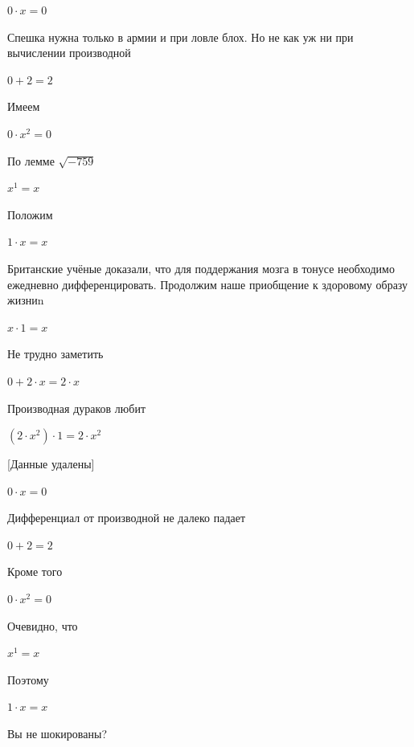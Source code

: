 \documentclass[12pt,a4paper,fleqn]{article}
\begin{document}
\begin{center}
$0 \cdot x = 0$\end{center}
Спешка нужна только в армии и при ловле блох. Но не как уж ни при вычислении производной\cite{link2}

\begin{center}
$0+2 = 2$\end{center}
Имеем

\begin{center}
$0 \cdot x^{2} = 0$\end{center}
По лемме $\sqrt{-759}$
\begin{center}
$x^{1} = x$\end{center}
Положим

\begin{center}
$1 \cdot x = x$\end{center}
Британские учёные доказали, что для поддержания мозга в тонусе необходимо ежедневно дифференцировать. Продолжим наше приобщение к здоровому образу жизниn

\begin{center}
$x \cdot 1 = x$\end{center}
Не трудно заметить

\begin{center}
$0+2 \cdot x = 2 \cdot x$\end{center}
Производная дураков любит\cite{link2}

\begin{center}
$(2 \cdot x^{2}) \cdot 1 = 2 \cdot x^{2}$\end{center}
[Данные удалены]

\begin{center}
$0 \cdot x = 0$\end{center}
Дифференциал от производной не далеко падает\cite{link2}

\begin{center}
$0+2 = 2$\end{center}
Кроме того

\begin{center}
$0 \cdot x^{2} = 0$\end{center}
Очевидно, что

\begin{center}
$x^{1} = x$\end{center}
Поэтому

\begin{center}
$1 \cdot x = x$\end{center}
Вы не шокированы?\cite{link3}
\end{document}
